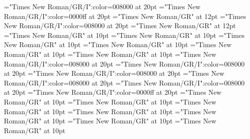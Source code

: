 \documentclass[a4paper]{article}
\begin{document}
\pagestyle{plain}
\sloppy
\setlength{\parfillskip}{0pt plus 1fil}
\font\pronunciationenUSpronunciationarticlebefore="Times New Roman/GR/I":color=008000 at 20pt
\font\pronunciationenUKpronunciationenUSbefore="Times New Roman/GR/I":color=0000ff at 20pt
\font\pronunciationenUSfirstoftypebefore="Times New Roman/GR" at 12pt
\font\pronunciationenUSpronunciationbefore="Times New Roman/GR/I":color=008000 at 20pt
\font\pronunciationenUSbefore="Times New Roman/GR" at 12pt
\font\sectionletterdictionary="Times New Roman/GR" at 10pt
\font\headsectionletterdictionary="Times New Roman/GR" at 10pt
\font\articledictionary="Times New Roman/GR" at 10pt
\font\firstoftypeheadwordlastoftypearticledictionary="Times New Roman/GR" at 10pt
\font\firstoftypegrammarrequireslastoftypearticledictionary="Times New Roman/GR" at 10pt
\font\firstoftypelastoftyperelationsynonymarticledictionary="Times New Roman/GR" at 10pt
\font\firstoftypepronunciationenUKarticledictionary="Times New Roman/GR/I":color=008000 at 20pt
\font\pronunciationfirstoftypebeforearticledictionary="Times New Roman/GR/I":color=008000 at 20pt
\font\firstoftypepronunciationenUSarticledictionary="Times New Roman/GR/I":color=008000 at 20pt
\font\pronunciationenUSfirstoftypebeforearticledictionary="Times New Roman/GR/I":color=008000 at 20pt
\font\lastoftypepronunciationenUKarticledictionary="Times New Roman/GR/I":color=008000 at 20pt
\font\pronunciationenUKpronunciationenUSbeforearticledictionary="Times New Roman/GR/I":color=0000ff at 20pt
\font\firstoftypegrammarcategorylastoftypearticledictionary="Times New Roman/GR" at 10pt
\font{}="Times New Roman/GR" at 10pt
\font\firstoftypelastoftypenotearticledictionary="Times New Roman/GR" at 10pt
\font\exampleusefirstoftypearticledictionary="Times New Roman/GR" at 10pt
\font\examplefirstoftypearticledictionary="Times New Roman/GR" at 10pt
\font\exampleuselastoftypearticledictionary="Times New Roman/GR" at 10pt
\font\examplelastoftypearticledictionary="Times New Roman/GR" at 10pt

\mbox{} 
\newpage 
\newpage 
\setcounter{page}{1} 
\pagestyle{fancy} 


\end{document}

